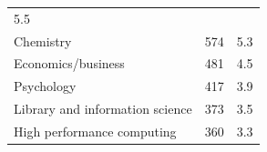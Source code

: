 \documentclass[]{article}
\begin{document}
\begin{longtable}[]{@{}lrr@{}}
\begin{minipage}[t]{0.05\columnwidth}
5.5\strut
\end{minipage}\tabularnewline
\begin{minipage}[t]{0.81\columnwidth}\raggedright\strut
Chemistry\strut
\end{minipage} & \begin{minipage}[t]{0.05\columnwidth}\raggedleft\strut
574\strut
\end{minipage} & \begin{minipage}[t]{0.05\columnwidth}\raggedleft\strut
5.3\strut
\end{minipage}\tabularnewline
\begin{minipage}[t]{0.81\columnwidth}\raggedright\strut
Economics/business\strut
\end{minipage} & \begin{minipage}[t]{0.05\columnwidth}\raggedleft\strut
481\strut
\end{minipage} & \begin{minipage}[t]{0.05\columnwidth}\raggedleft\strut
4.5\strut
\end{minipage}\tabularnewline
\begin{minipage}[t]{0.81\columnwidth}\raggedright\strut
Psychology\strut
\end{minipage} & \begin{minipage}[t]{0.05\columnwidth}\raggedleft\strut
417\strut
\end{minipage} & \begin{minipage}[t]{0.05\columnwidth}\raggedleft\strut
3.9\strut
\end{minipage}\tabularnewline
\begin{minipage}[t]{0.81\columnwidth}\raggedright\strut
Library and information science\strut
\end{minipage} & \begin{minipage}[t]{0.05\columnwidth}\raggedleft\strut
373\strut
\end{minipage} & \begin{minipage}[t]{0.05\columnwidth}\raggedleft\strut
3.5\strut
\end{minipage}\tabularnewline
\begin{minipage}[t]{0.81\columnwidth}\raggedright\strut
High performance computing\strut
\end{minipage} & \begin{minipage}[t]{0.05\columnwidth}\raggedleft\strut
360\strut
\end{minipage} & \begin{minipage}[t]{0.05\columnwidth}\raggedleft\strut
3.3\strut
\end{minipage}\tabularnewline

\end{longtable}
\end{document}
